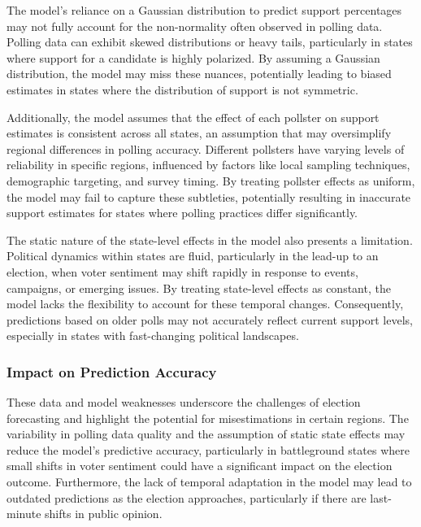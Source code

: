 \documentclass[
  letterpaper,
  DIV=11,
  numbers=noendperiod]{scrartcl}
\begin{document}
The model's reliance on a Gaussian distribution to predict support
percentages may not fully account for the non-normality often observed
in polling data. Polling data can exhibit skewed distributions or heavy
tails, particularly in states where support for a candidate is highly
polarized. By assuming a Gaussian distribution, the model may miss these
nuances, potentially leading to biased estimates in states where the
distribution of support is not symmetric.

Additionally, the model assumes that the effect of each pollster on
support estimates is consistent across all states, an assumption that
may oversimplify regional differences in polling accuracy. Different
pollsters have varying levels of reliability in specific regions,
influenced by factors like local sampling techniques, demographic
targeting, and survey timing. By treating pollster effects as uniform,
the model may fail to capture these subtleties, potentially resulting in
inaccurate support estimates for states where polling practices differ
significantly.

The static nature of the state-level effects in the model also presents
a limitation. Political dynamics within states are fluid, particularly
in the lead-up to an election, when voter sentiment may shift rapidly in
response to events, campaigns, or emerging issues. By treating
state-level effects as constant, the model lacks the flexibility to
account for these temporal changes. Consequently, predictions based on
older polls may not accurately reflect current support levels,
especially in states with fast-changing political landscapes.

\subsubsection{Impact on Prediction
Accuracy}\label{impact-on-prediction-accuracy}

These data and model weaknesses underscore the challenges of election
forecasting and highlight the potential for misestimations in certain
regions. The variability in polling data quality and the assumption of
static state effects may reduce the model's predictive accuracy,
particularly in battleground states where small shifts in voter
sentiment could have a significant impact on the election outcome.
Furthermore, the lack of temporal adaptation in the model may lead to
outdated predictions as the election approaches, particularly if there
are last-minute shifts in public opinion.
\end{document}
